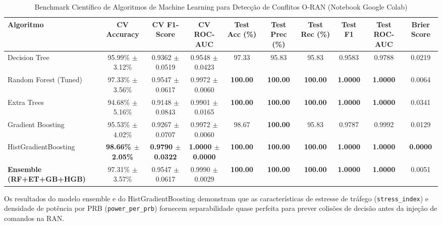 \documentclass[10pt,journal,compsoc,a4paper]{IEEEtran}
\begin{document}
\begin{table}[t]
\centering
\caption{Benchmark Científico de Algoritmos de Machine Learning para Detecção de Conflitos O-RAN (Notebook Google Colab)}
\label{tab:ml_benchmark}
\begin{tabularx}{\textwidth}{l c c c c c c c c c}
\toprule
\textbf{Algoritmo} & \textbf{CV Accuracy} & \textbf{CV F1-Score} & \textbf{CV ROC-AUC} & \textbf{Test Acc (\%)} & \textbf{Test Prec (\%)} & \textbf{Test Rec (\%)} & \textbf{Test F1} & \textbf{Test ROC-AUC} & \textbf{Brier Score} \\
\midrule
Decision Tree & 95.99\% $\pm$ 3.12\% & 0.9362 $\pm$ 0.0519 & 0.9548 $\pm$ 0.0423 & 97.33 & 95.83 & 95.83 & 0.9583 & 0.9788 & 0.0219 \\
Random Forest (Tuned) & 97.33\% $\pm$ 3.56\% & 0.9547 $\pm$ 0.0617 & 0.9972 $\pm$ 0.0060 & \textbf{100.00} & \textbf{100.00} & \textbf{100.00} & \textbf{1.0000} & \textbf{1.0000} & 0.0064 \\
Extra Trees & 94.68\% $\pm$ 5.16\% & 0.9148 $\pm$ 0.0843 & 0.9901 $\pm$ 0.0165 & \textbf{100.00} & \textbf{100.00} & \textbf{100.00} & \textbf{1.0000} & \textbf{1.0000} & 0.0341 \\
Gradient Boosting & 95.53\% $\pm$ 4.02\% & 0.9267 $\pm$ 0.0707 & 0.9972 $\pm$ 0.0060 & 98.67 & \textbf{100.00} & 95.83 & 0.9787 & 0.9992 & 0.0129 \\
HistGradientBoosting & \textbf{98.66\% $\pm$ 2.05\%} & \textbf{0.9790 $\pm$ 0.0322} & \textbf{1.0000 $\pm$ 0.0000} & \textbf{100.00} & \textbf{100.00} & \textbf{100.00} & \textbf{1.0000} & \textbf{1.0000} & \textbf{0.0000} \\
\textbf{Ensemble (RF+ET+GB+HGB)} & 97.31\% $\pm$ 3.57\% & 0.9547 $\pm$ 0.0617 & 0.9990 $\pm$ 0.0029 & \textbf{100.00} & \textbf{100.00} & \textbf{100.00} & \textbf{1.0000} & \textbf{1.0000} & 0.0051 \\
\bottomrule
\end{tabularx}
\end{table}

Os resultados do modelo ensemble e do HistGradientBoosting demonstram que as características de estresse de tráfego (\texttt{stress\_index}) e densidade de potência por PRB (\texttt{power\_per\_prb}) fornecem separabilidade quase perfeita para prever colisões de decisão antes da injeção de comandos na RAN.
\end{document}
